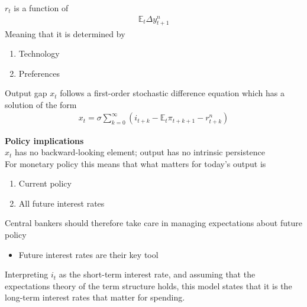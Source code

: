 \documentclass{beamer}
\begin{document}
\begin{frame}
  $r_t$ is a function of
  \begin{align}
    \mathbb{E}_t \Delta y_{t+1}^n
  \end{align}
  Meaning that it is determined by 
  \begin{enumerate}
    \item Technology
    \item Preferences
  \end{enumerate}
  Output gap $x_t$ follows a first-order stochastic difference equation which has a solution of the form
\begin{align}
  x_t = \sigma \sum_{k=0}^{\infty} (i_{t+k} - \mathbb{E}_t \pi_{t+k+1} - r_{t+k}^n)  
\end{align}  
\end{frame}

\begin{frame}
  \textbf{Policy implications}\\
   $x_t$ has no backward-looking element; output has no intrinsic persistence\\
   For monetary policy this means that what matters for today's output is
   \begin{enumerate}
     \item Current policy
     \item All future interest rates
   \end{enumerate}
\end{frame}

\begin{frame}
  Central bankers should therefore take care in managing expectations about future policy
  \begin{itemize}
    \item Future interest rates are their key tool
  \end{itemize}
Interpreting $i_t$ as the short-term interest rate, and assuming that the expectations theory of the term structure holds, this model states that it is the long-term interest rates that matter for spending.   
\end{frame}
\end{document}
